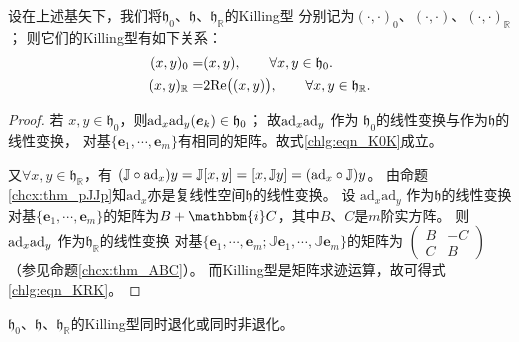 \begin{proposition}
	设在上述基矢下，我们将$\mathfrak{h}_{0}$、$\mathfrak{h}$、$\mathfrak{h}_{\mathbb{R}}$的Killing型
	分别记为$(\cdot,\cdot)_0$、$(\cdot,\cdot)$、$(\cdot,\cdot)_{\mathbb{R}}$；
	则它们的Killing型有如下关系：
	\begin{align}
		(x,y)_0 =& (x,y),\qquad \forall x,y \in \mathfrak{h}_{0}. \label{chlg:eqn_K0K} \\
		(x,y)_{\mathbb{R}} =& 2{\rm Re}\bigl((x,y)\bigr),\qquad 
		\forall x,y \in \mathfrak{h}_{\mathbb{R}}. \label{chlg:eqn_KRK}
	\end{align}    
\end{proposition}
\begin{proof}
若 $x, y \in \mathfrak{h}_0$，则${\rm ad}_x \mathrm{ad}_y (\boldsymbol{e}_k) \in \mathfrak{h}_0$；
故${\rm ad}_x \mathrm{ad}_y$ 作为 $\mathfrak{h}_0$的线性变换与作为$\mathfrak{h}$的线性变换，
对基$\{\boldsymbol{e}_1,\cdots,\boldsymbol{e}_m\}$有相同的矩阵。故式\eqref{chlg:eqn_K0K}成立。

又$\forall x, y \in \mathfrak{h}_{\mathbb{R}}$，有
$(\mathbb{J}\circ {\rm ad}_x) y=\mathbb{J}[x, y]=[x, \mathbb{J} y]=({\rm ad}_x \circ \mathbb{J}) y $。
由命题\ref{chcx:thm_pJJp}知$\mathrm{ad}_x$亦是复线性空间$\mathfrak{h}$的线性变换。
设 $\mathrm{ad}_x \mathrm{ad}_y$ 作为$\mathfrak{h}$的线性变换
对基$\{\boldsymbol{e}_1,\cdots,\boldsymbol{e}_m\}$的矩阵为$B+\mathbbm{i}C$，其中$B$、$C$是$m$阶实方阵。
则${\rm ad}_x \mathrm{ad}_y$ 作为$\mathfrak{h}_{\mathbb{R}}$的线性变换
对基$\{\boldsymbol{e}_1,\cdots,\boldsymbol{e}_m;\mathbb{J}\boldsymbol{e}_1,\cdots,\mathbb{J}\boldsymbol{e}_m\}$的矩阵为
$    \left(\begin{smallmatrix}
    B& -C \\ C & B
\end{smallmatrix}\right)$（参见命题\ref{chcx:thm_ABC}）。
而Killing型是矩阵求迹运算，故可得式\eqref{chlg:eqn_KRK}。
\end{proof}

\begin{proposition}\label{chlg:thm_h0hhR}
    $\mathfrak{h}_0$、$ \mathfrak{h}$、$ \mathfrak{h}_{\mathbb{R}}$的Killing型同时退化或同时非退化。
\end{proposition}

